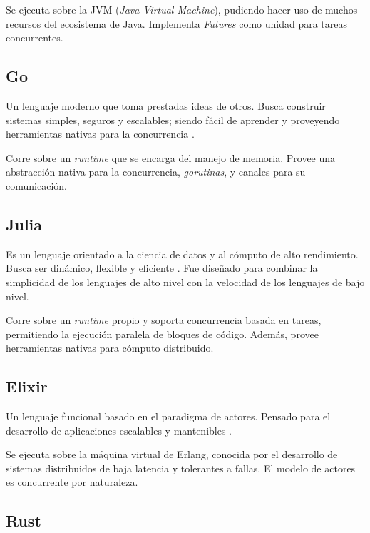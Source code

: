 \documentclass[11pt]{article}
\let\Oldsubsection\subsection
\renewcommand{\subsection}{\FloatBarrier\Oldsubsection}
\newcommand{\english}[1]{\textit{#1}}
\newcommand{\technical}[1]{\textit{#1}}
\begin{document}
Se ejecuta sobre la JVM (\technical{Java Virtual Machine}), pudiendo hacer uso de muchos recursos del ecosistema de Java. Implementa \english{Futures} como unidad para tareas concurrentes.

\subsection{Go}

Un lenguaje moderno que toma prestadas ideas de otros. Busca construir sistemas simples, seguros y escalables; siendo fácil de aprender y proveyendo herramientas nativas para la concurrencia \cite{com:go}.

Corre sobre un \english{runtime} que se encarga del manejo de memoria. Provee una abstracción nativa para la concurrencia, \technical{gorutinas}, y canales para su comunicación.

\subsection{Julia}

Es un lenguaje orientado a la ciencia de datos y al cómputo de alto rendimiento. Busca ser dinámico, flexible y eficiente \cite{com:julia}. Fue diseñado para combinar la simplicidad de los lenguajes de alto nivel con la velocidad de los lenguajes de bajo nivel.

Corre sobre un \english{runtime} propio y soporta concurrencia basada en tareas, permitiendo la ejecución paralela de bloques de código. Además, provee herramientas nativas para cómputo distribuido.

\subsection{Elixir}

Un lenguaje funcional basado en el paradigma de actores. Pensado para el desarrollo de aplicaciones escalables y mantenibles \cite{com:elixir}.

Se ejecuta sobre la máquina virtual de Erlang, conocida por el desarrollo de sistemas distribuidos de baja latencia y tolerantes a fallas. El modelo de actores es concurrente por naturaleza.

\subsection{Rust}
\end{document}
